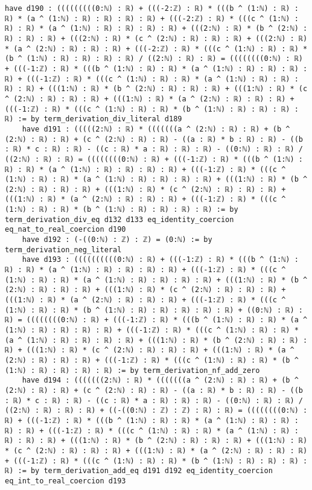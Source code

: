 \documentclass{article}
\begin{document}
\begin{tcolorbox}[colback=white!10, width=\linewidth]
\begin{lstlisting}[language=Lean4]
    have d190 : (((((((((0:ℕ) : ℝ) + (((-2:ℤ) : ℝ) * (((b ^ (1:ℕ) : ℝ) : ℝ) * (a ^ (1:ℕ) : ℝ) : ℝ) : ℝ) : ℝ) + (((-2:ℤ) : ℝ) * (((c ^ (1:ℕ) : ℝ) : ℝ) * (a ^ (1:ℕ) : ℝ) : ℝ) : ℝ) : ℝ) + (((2:ℕ) : ℝ) * (b ^ (2:ℕ) : ℝ) : ℝ) : ℝ) + (((2:ℕ) : ℝ) * (c ^ (2:ℕ) : ℝ) : ℝ) : ℝ) + (((2:ℕ) : ℝ) * (a ^ (2:ℕ) : ℝ) : ℝ) : ℝ) + (((-2:ℤ) : ℝ) * (((c ^ (1:ℕ) : ℝ) : ℝ) * (b ^ (1:ℕ) : ℝ) : ℝ) : ℝ) : ℝ) / ((2:ℕ) : ℝ) : ℝ) = ((((((((0:ℕ) : ℝ) + (((-1:ℤ) : ℝ) * (((b ^ (1:ℕ) : ℝ) : ℝ) * (a ^ (1:ℕ) : ℝ) : ℝ) : ℝ) : ℝ) + (((-1:ℤ) : ℝ) * (((c ^ (1:ℕ) : ℝ) : ℝ) * (a ^ (1:ℕ) : ℝ) : ℝ) : ℝ) : ℝ) + (((1:ℕ) : ℝ) * (b ^ (2:ℕ) : ℝ) : ℝ) : ℝ) + (((1:ℕ) : ℝ) * (c ^ (2:ℕ) : ℝ) : ℝ) : ℝ) + (((1:ℕ) : ℝ) * (a ^ (2:ℕ) : ℝ) : ℝ) : ℝ) + (((-1:ℤ) : ℝ) * (((c ^ (1:ℕ) : ℝ) : ℝ) * (b ^ (1:ℕ) : ℝ) : ℝ) : ℝ) : ℝ) := by term_derivation_div_literal d189
    have d191 : (((((2:ℕ) : ℝ) * (((((((a ^ (2:ℕ) : ℝ) : ℝ) + (b ^ (2:ℕ) : ℝ) : ℝ) + (c ^ (2:ℕ) : ℝ) : ℝ) - ((a : ℝ) * b : ℝ) : ℝ) - ((b : ℝ) * c : ℝ) : ℝ) - ((c : ℝ) * a : ℝ) : ℝ) : ℝ) - ((0:ℕ) : ℝ) : ℝ) / ((2:ℕ) : ℝ) : ℝ) = ((((((((0:ℕ) : ℝ) + (((-1:ℤ) : ℝ) * (((b ^ (1:ℕ) : ℝ) : ℝ) * (a ^ (1:ℕ) : ℝ) : ℝ) : ℝ) : ℝ) + (((-1:ℤ) : ℝ) * (((c ^ (1:ℕ) : ℝ) : ℝ) * (a ^ (1:ℕ) : ℝ) : ℝ) : ℝ) : ℝ) + (((1:ℕ) : ℝ) * (b ^ (2:ℕ) : ℝ) : ℝ) : ℝ) + (((1:ℕ) : ℝ) * (c ^ (2:ℕ) : ℝ) : ℝ) : ℝ) + (((1:ℕ) : ℝ) * (a ^ (2:ℕ) : ℝ) : ℝ) : ℝ) + (((-1:ℤ) : ℝ) * (((c ^ (1:ℕ) : ℝ) : ℝ) * (b ^ (1:ℕ) : ℝ) : ℝ) : ℝ) : ℝ) := by term_derivation_div_eq d132 d133 eq_identity_coercion eq_nat_to_real_coercion d190
    have d192 : (-((0:ℕ) : ℤ) : ℤ) = (0:ℕ) := by term_derivation_neg_literal
    have d193 : ((((((((((0:ℕ) : ℝ) + (((-1:ℤ) : ℝ) * (((b ^ (1:ℕ) : ℝ) : ℝ) * (a ^ (1:ℕ) : ℝ) : ℝ) : ℝ) : ℝ) + (((-1:ℤ) : ℝ) * (((c ^ (1:ℕ) : ℝ) : ℝ) * (a ^ (1:ℕ) : ℝ) : ℝ) : ℝ) : ℝ) + (((1:ℕ) : ℝ) * (b ^ (2:ℕ) : ℝ) : ℝ) : ℝ) + (((1:ℕ) : ℝ) * (c ^ (2:ℕ) : ℝ) : ℝ) : ℝ) + (((1:ℕ) : ℝ) * (a ^ (2:ℕ) : ℝ) : ℝ) : ℝ) + (((-1:ℤ) : ℝ) * (((c ^ (1:ℕ) : ℝ) : ℝ) * (b ^ (1:ℕ) : ℝ) : ℝ) : ℝ) : ℝ) : ℝ) + ((0:ℕ) : ℝ) : ℝ) = ((((((((0:ℕ) : ℝ) + (((-1:ℤ) : ℝ) * (((b ^ (1:ℕ) : ℝ) : ℝ) * (a ^ (1:ℕ) : ℝ) : ℝ) : ℝ) : ℝ) + (((-1:ℤ) : ℝ) * (((c ^ (1:ℕ) : ℝ) : ℝ) * (a ^ (1:ℕ) : ℝ) : ℝ) : ℝ) : ℝ) + (((1:ℕ) : ℝ) * (b ^ (2:ℕ) : ℝ) : ℝ) : ℝ) + (((1:ℕ) : ℝ) * (c ^ (2:ℕ) : ℝ) : ℝ) : ℝ) + (((1:ℕ) : ℝ) * (a ^ (2:ℕ) : ℝ) : ℝ) : ℝ) + (((-1:ℤ) : ℝ) * (((c ^ (1:ℕ) : ℝ) : ℝ) * (b ^ (1:ℕ) : ℝ) : ℝ) : ℝ) : ℝ) := by term_derivation_nf_add_zero
    have d194 : (((((((2:ℕ) : ℝ) * (((((((a ^ (2:ℕ) : ℝ) : ℝ) + (b ^ (2:ℕ) : ℝ) : ℝ) + (c ^ (2:ℕ) : ℝ) : ℝ) - ((a : ℝ) * b : ℝ) : ℝ) - ((b : ℝ) * c : ℝ) : ℝ) - ((c : ℝ) * a : ℝ) : ℝ) : ℝ) - ((0:ℕ) : ℝ) : ℝ) / ((2:ℕ) : ℝ) : ℝ) : ℝ) + ((-((0:ℕ) : ℤ) : ℤ) : ℝ) : ℝ) = ((((((((0:ℕ) : ℝ) + (((-1:ℤ) : ℝ) * (((b ^ (1:ℕ) : ℝ) : ℝ) * (a ^ (1:ℕ) : ℝ) : ℝ) : ℝ) : ℝ) + (((-1:ℤ) : ℝ) * (((c ^ (1:ℕ) : ℝ) : ℝ) * (a ^ (1:ℕ) : ℝ) : ℝ) : ℝ) : ℝ) + (((1:ℕ) : ℝ) * (b ^ (2:ℕ) : ℝ) : ℝ) : ℝ) + (((1:ℕ) : ℝ) * (c ^ (2:ℕ) : ℝ) : ℝ) : ℝ) + (((1:ℕ) : ℝ) * (a ^ (2:ℕ) : ℝ) : ℝ) : ℝ) + (((-1:ℤ) : ℝ) * (((c ^ (1:ℕ) : ℝ) : ℝ) * (b ^ (1:ℕ) : ℝ) : ℝ) : ℝ) : ℝ) := by term_derivation_add_eq d191 d192 eq_identity_coercion eq_int_to_real_coercion d193

\end{lstlisting}
\end{tcolorbox}
\end{document}
